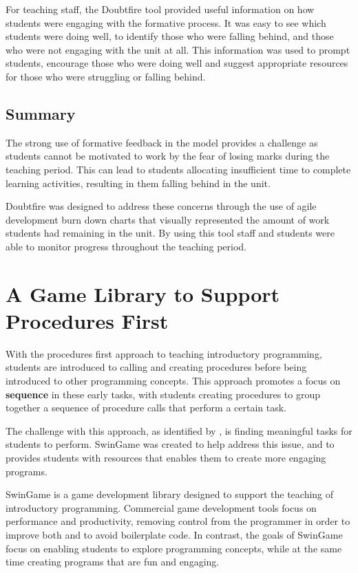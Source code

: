 For teaching staff, the Doubtfire tool provided useful information on how students were engaging with the formative process. It was easy to see which students were doing well, to identify those who were falling behind, and those who were not engaging with the unit at all. This information was used to prompt students, encourage those who were doing well and suggest appropriate resources for those who were struggling or falling behind.

\subsection{Summary} %
\label{sub:doubtfire_summary}

The strong use of formative feedback in the model provides a challenge as students cannot be motivated to work by the fear of losing marks during the teaching period. This can lead to students allocating insufficient time to complete learning activities, resulting in them falling behind in the unit.

Doubtfire was designed to address these concerns through the use of agile development burn down charts that visually represented the amount of work students had remaining in the unit. By using this tool staff and students were able to monitor progress throughout the teaching period.


\clearpage
\section{A Game Library to Support Procedures First} %
\label{sec:swingame}

With the procedures first approach to teaching introductory programming, students are introduced to calling and creating procedures before being introduced to other programming concepts. This approach promotes a focus on \textbf{sequence} in these early tasks, with students creating procedures to group together a sequence of procedure calls that perform a certain task. 

The challenge with this approach, as identified by \citet{Pattis:1993}, is finding meaningful tasks for students to perform. SwinGame was created to help address this issue, and to provides students with resources that enables them to create more engaging programs.

SwinGame is a game development library designed to support the teaching of introductory programming. Commercial game development tools focus on performance and productivity, removing control from the programmer in order to improve both and to avoid boilerplate code. In contrast, the goals of SwinGame focus on enabling students to explore programming concepts, while at the same time creating programs that are fun and engaging. 

